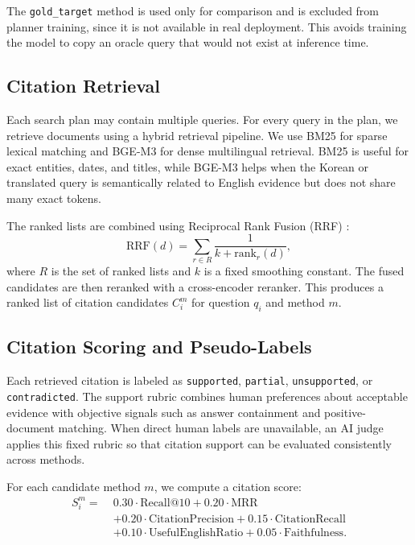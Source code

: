 \documentclass{article}
\begin{document}
The \texttt{gold\_target} method is used only for comparison and is excluded from planner training, since it is not available in real deployment. This avoids training the model to copy an oracle query that would not exist at inference time.

\subsection{Citation Retrieval}

Each search plan may contain multiple queries. For every query in the plan, we retrieve documents using a hybrid retrieval pipeline. We use BM25 for sparse lexical matching and BGE-M3 \cite{chen2024bgem3} for dense multilingual retrieval. BM25 is useful for exact entities, dates, and titles, while BGE-M3 helps when the Korean or translated query is semantically related to English evidence but does not share many exact tokens.

The ranked lists are combined using Reciprocal Rank Fusion (RRF) \cite{cormack2009reciprocal}:
\[
\text{RRF}(d) = \sum_{r \in R} \frac{1}{k + \text{rank}_r(d)},
\]
where $R$ is the set of ranked lists and $k$ is a fixed smoothing constant. The fused candidates are then reranked with a cross-encoder reranker. This produces a ranked list of citation candidates $C_i^m$ for question $q_i$ and method $m$.

\subsection{Citation Scoring and Pseudo-Labels}

Each retrieved citation is labeled as \texttt{supported}, \texttt{partial}, \texttt{unsupported}, or \texttt{contradicted}. The support rubric combines human preferences about acceptable evidence with objective signals such as answer containment and positive-document matching. When direct human labels are unavailable, an AI judge applies this fixed rubric so that citation support can be evaluated consistently across methods.

For each candidate method $m$, we compute a citation score:
\begin{equation*}
\begin{split}
S_i^m = \; & 0.30 \cdot \text{Recall@10} + 0.20 \cdot \text{MRR} \\
& + 0.20 \cdot \text{CitationPrecision} + 0.15 \cdot \text{CitationRecall} \\
& + 0.10 \cdot \text{UsefulEnglishRatio} + 0.05 \cdot \text{Faithfulness}.
\end{split}
\end{equation*}
\end{document}
